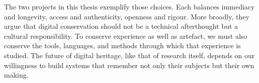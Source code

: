 The two projects in this thesis exemplify those choices. Each balances immediacy and longevity, access and authenticity, openness and rigour. More broadly, they argue that digital conservation should not be a technical afterthought but a cultural responsibility. To conserve experience as well as artefact, we must also conserve the tools, languages, and methods through which that experience is studied. The future of digital heritage, like that of research itself, depends on our willingness to build systems that remember not only their subjects but their own making.

